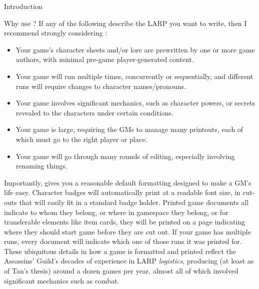 \documentclass[sheet]{GameTexBase}
\begin{document}
\begin{section}{Introduction}
\begin{subsection}{Why use \gametex{}?}
If any of the following describe the LARP you want to write, then I recommend strongly considering \gametex{}:
\begin{itemize}
\item Your game's character sheets and/or lore are prewritten by one or more game authors, with minimal pre-game player-generated content.
\item Your game will run multiple times, concurrently or sequentially, and different runs will require changes to character names/pronouns.
\item Your game involves significant mechanics, such as character powers, or secrets revealed to the characters under certain conditions.
\item Your game is large, requiring the GMs to manage many printouts, each of which must go to the right player or place.
\item Your game will go through many rounds of editing, especially involving renaming things.
\end{itemize}

Importantly, \gametex{} gives you a reasonable default formatting designed to make a GM's life easy.  Character badges will automatically print at a readable font size, in cut-outs that will easily fit in a standard badge holder.  Printed game documents all indicate to whom they belong, or where in gamespace they belong, or for transferable elements like item cards, they will be printed on a page indicating where they should start game before they are cut out.  If your game has multiple runs, every document will indicate which one of those runs it was printed for.  These ubiquitous details in how a game is formatted and printed reflect the Assassins' Guild's decades of experience in LARP \emph{logistics}, producing (at least as of Tan's thesis) around a dozen games per year, almost all of which involved significant mechanics such as combat.
\end{subsection}
\end{section}
\end{document}
